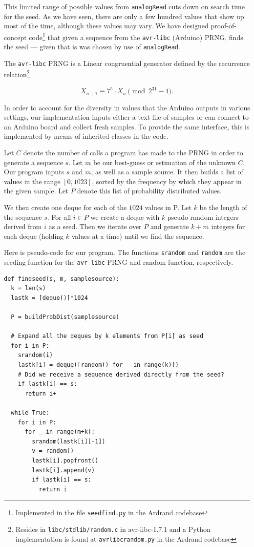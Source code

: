 \documentclass[a4paper]{article}           %
\begin{document}
This limited range of possible values from \texttt{analogRead} cuts down on search time for the seed. As we have seen, there are only a few hundred values that show up most of the time, although these values may vary. We have designed proof-of-concept code\footnote{Implemented in the file \texttt{seedfind.py} in the Ardrand codebase} that given a sequence from the \texttt{avr-libc} (Arduino) PRNG, finds the seed --- given that is was chosen by use of \texttt{analogRead}. 

The \texttt{avr-libc} PRNG is a Linear congruential generator defined by the recurrence relation\footnote{Resides in \texttt{libc/stdlib/random.c} in avr-libc-1.7.1 and a Python implementation is found at \texttt{avrlibcrandom.py} in the Ardrand codebase}

\[
X_{n+1} \equiv 7^5 \cdot X_n \pmod{2^{31} -1}.
\]

In order to account for the diversity in values that the Arduino outputs in various settings, our implementation inputs either a text file of samples or can connect to an Arduino board and collect fresh samples. To provide the same interface, this is implemented by means of inherited classes in the code. 

Let $C$ denote the number of calls a program has made to the PRNG in order to generate a sequence $s$. Let $m$ be our best-guess or estimation of the unknown $C$. Our program inputs $s$ and $m$, as well as a sample source. It then builds a list of values in the range $[0, 1023]$, sorted by the frequency by which they appear in the given sample. Let $P$ denote this list of probability distributed values.

We then create one deque for each of the $1024$ values in P. Let $k$ be the length of the sequence $s$. For all $i \in P$ we create a deque with $k$ pseudo random integers derived from $i$ as a seed. Then we iterate over $P$ and generate $k+m$ integers for each deque (holding $k$ values at a time) until we find the sequence. 

Here is pseudo-code for our program. The functions \texttt{srandom} and \texttt{random} are the seeding function for the \texttt{avr-libc} PRNG and random function, respectively. 

\begin{lstlisting}[caption=Finding the seed]
def findseed(s, m, samplesource):
  k = len(s)
  lastk = [deque()]*1024

  P = buildProbDist(samplesource)

  # Expand all the deques by k elements from P[i] as seed
  for i in P:
    srandom(i)
    lastk[i] = deque([random() for _ in range(k)])
    # Did we receive a sequence derived directly from the seed?
    if lastk[i] == s:
      return i+

  while True:
    for i in P:
      for _ in range(m+k):
        srandom(lastk[i][-1])
        v = random()
        lastk[i].popfront()
        lastk[i].append(v)
        if lastk[i] == s:
          return i
\end{lstlisting}
\end{document}
